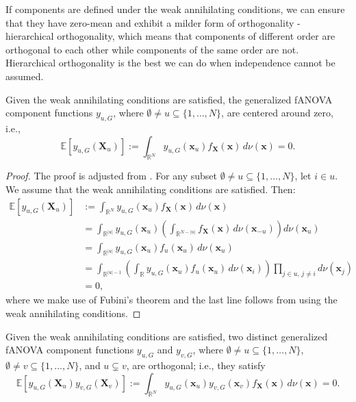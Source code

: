 If components are defined under the weak annihilating conditions, we can ensure that they have zero-mean and exhibit a milder form of orthogonality - hierarchical orthogonality, which means that components of different order are orthogonal to each other while components of the same order are not. Hierarchical orthogonality is the best we can do when independence cannot be assumed.
\begin{proposition}\label{eq:zero_mean_g}
    Given the weak annihilating conditions are satisfied, the generalized fANOVA component functions $y_{u, G}$, where $\emptyset \neq u \subseteq \{1, \ldots, N\}$, are centered around zero, i.e.,
\begin{equation}
    \mathbb{E}[y_{u, G}(\boldsymbol{X}_u)] := \int_{\mathbb{R}^N} y_{u, G}(\boldsymbol{x}_u) f_{\boldsymbol{X}}(\boldsymbol{x}) \, d\nu (\boldsymbol{x}) = 0.
\end{equation}
\end{proposition}

\begin{proof}
The proof is adjusted from \cite{rahman2014}. For any subset $\emptyset \ne u \subseteq \{1, \ldots, N\}$, let $i \in u$. We assume that the weak annihilating conditions are satisfied. Then:
\begin{align*}
\mathbb{E}[y_{u,G}(\boldsymbol{X}_u)] 
&:= \int_{\mathbb{R}^N} y_{u,G}(\boldsymbol{x}_u) f_{\boldsymbol{X}}(\boldsymbol{x})\, d \nu (\boldsymbol{x}) \\[0.5em]
&= \int_{\mathbb{R}^{|u|}} y_{u,G}(\boldsymbol{x}_u) \left( \int_{\mathbb{R}^{N - |u|}} f_{\boldsymbol{X}}(\boldsymbol{x}) \, d \nu(\boldsymbol{x}_{-u}) \right) d \nu(\boldsymbol{x}_u) \\[0.5em]
&= \int_{\mathbb{R}^{|u|}} y_{u,G}(\boldsymbol{x}_u) f_u(\boldsymbol{x}_u)\, d \nu(\boldsymbol{x}_u) \\[0.5em]
&= \int_{\mathbb{R}^{|u| - 1}} \left( \int_{\mathbb{R}} y_{u,G}(\boldsymbol{x}_u) f_u(\boldsymbol{x}_u) \, d \nu(\boldsymbol{x}_i) \right) \prod_{j \in u,\, j \ne i} d \nu(\boldsymbol{x}_j) \\[0.5em]
&= 0,
\end{align*}
where we make use of Fubini's theorem and the last line follows from using the weak annihilating conditions.
\end{proof}

\begin{proposition}\label{prop:hierarchical_orthogonality}
    Given the weak annihilating conditions are satisfied, two distinct generalized fANOVA component functions $y_{u,G}$ and $y_{v,G}$, where $\emptyset \neq u \subseteq \{1,\ldots,N\}$, $\emptyset \neq v \subseteq \{1,\ldots,N\}$, and $u \subsetneq v$, are orthogonal; i.e., they satisfy
\begin{equation}
    \mathbb{E}[y_{u, G}(\boldsymbol{X}_u)y_{v, G}(\boldsymbol{X}_v)] := \int_{\mathbb{R}^N} y_{u, G}(\boldsymbol{x}_u) y_{v, G}(\boldsymbol{x}_v) f_{\boldsymbol{X}}(\boldsymbol{x}) \, d\nu (\boldsymbol{x}) = 0.
\end{equation}
\end{proposition}

